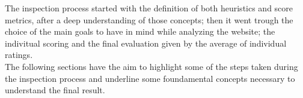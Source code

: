 The inspection process started with the definition of both heuristics and score metrics, after a deep understanding of those concepts; then it went trough the choice of the main goals to have in mind while analyzing the website; the indivitual scoring and the final evaluation given by the average of individual ratings.\\
The following sections have the aim to highlight some of the steps taken during the inspection process and underline some foundamental concepts necessary to understand the final result.